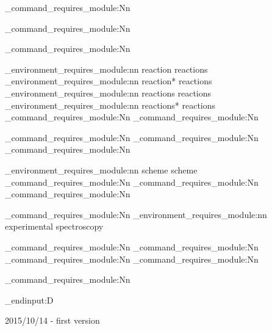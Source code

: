 \chemmacros_command_requires_module:Nn 

\chemmacros_command_requires_module:Nn 

\chemmacros_command_requires_module:Nn 

\chemmacros_environment_requires_module:nn {reaction} {reactions}
\chemmacros_environment_requires_module:nn {reaction*} {reactions}
\chemmacros_environment_requires_module:nn {reactions} {reactions}
\chemmacros_environment_requires_module:nn {reactions*} {reactions}
\chemmacros_command_requires_module:Nn 
\chemmacros_command_requires_module:Nn 

\chemmacros_command_requires_module:Nn 
\chemmacros_command_requires_module:Nn 
\chemmacros_command_requires_module:Nn 

\chemmacros_environment_requires_module:nn {scheme} {scheme}
\chemmacros_command_requires_module:Nn 
\chemmacros_command_requires_module:Nn 
\chemmacros_command_requires_module:Nn 

\chemmacros_command_requires_module:Nn 
\chemmacros_environment_requires_module:nn {experimental} {spectroscopy}

\chemmacros_command_requires_module:Nn 
\chemmacros_command_requires_module:Nn 
\chemmacros_command_requires_module:Nn 
\chemmacros_command_requires_module:Nn 

\chemmacros_command_requires_module:Nn 


\tex_endinput:D

2015/10/14 - first version
